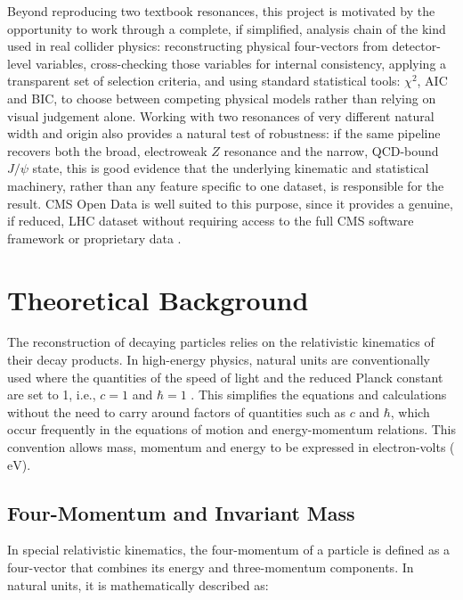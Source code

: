 \documentclass[11pt, a4paper]{article}
\numberwithin{equation}{section}
\begin{document}
Beyond reproducing two textbook resonances, this project is motivated by the opportunity to work through a complete, if simplified, analysis chain of the kind used in real collider physics: reconstructing physical four-vectors from detector-level variables, cross-checking those variables for internal consistency, applying a transparent set of selection criteria, and using standard statistical tools: $\chi^2$, AIC and BIC, to choose between competing physical models rather than relying on visual judgement alone. Working with two resonances of very different natural width and origin also provides a natural test of robustness: if the same pipeline recovers both the broad, electroweak $Z$ resonance and the narrow, QCD-bound $J/\psi$ state, this is good evidence that the underlying kinematic and statistical machinery, rather than any feature specific to one dataset, is responsible for the result. CMS Open Data is well suited to this purpose, since it provides a genuine, if reduced, LHC dataset without requiring access to the full CMS software framework or proprietary data \cite{cmscollaboration2008cms, mccauley2019zmumusimplified, mccauley2019zeesimplified, mccauley2017zmumu, mccauley2017jpsimumu}.

\section{Theoretical Background}

The reconstruction of decaying particles relies on the relativistic kinematics of their decay products. In high-energy physics, natural units are conventionally used where the quantities of the speed of light and the reduced Planck constant are set to 1, i.e., $c=1$ and $\hbar=1$ \cite{perkins1987highenergy}. This simplifies the equations and calculations without the need to carry around factors of quantities such as $c$ and $\hbar$, which occur frequently in the equations of motion and energy-momentum relations. This convention allows mass, momentum and energy to be expressed in electron-volts ($\text{eV}$).

\subsection{Four-Momentum and Invariant Mass}

In special relativistic kinematics, the four-momentum of a particle is defined as a four-vector that combines its energy and three-momentum components. In natural units, it is mathematically described as:
\end{document}
